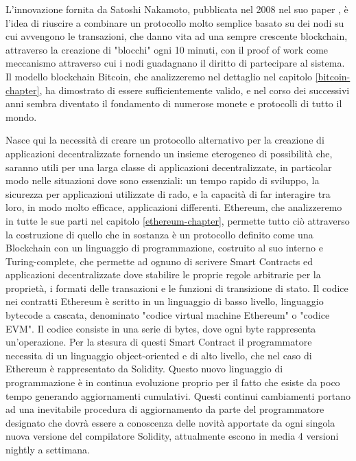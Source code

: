 L'innovazione fornita da Satoshi Nakamoto, pubblicata nel 2008 nel suo paper \cite{paper-bitcoin:satoshi}, è l'idea di riuscire a combinare un protocollo molto semplice basato su dei nodi su cui avvengono le transazioni, che danno vita ad una sempre crescente blockchain, attraverso la creazione di "blocchi" ogni 10 minuti, con il proof of work come meccanismo attraverso cui i nodi guadagnano il diritto di partecipare al sistema. Il modello blockchain Bitcoin, che analizzeremo nel dettaglio nel capitolo \ref{bitcoin-chapter}, ha dimostrato di essere sufficientemente valido, e nel corso dei successivi anni sembra diventato il fondamento di numerose monete e protocolli di tutto il mondo. 

Nasce qui la necessità di creare un protocollo alternativo per la creazione di applicazioni decentralizzate fornendo un insieme eterogeneo di possibilità che, saranno utili per una larga classe di applicazioni decentralizzate, in particolar modo nelle situazioni dove sono essenziali: un tempo rapido di sviluppo, la sicurezza per applicazioni utilizzate di rado, e la capacità di far interagire tra loro, in modo molto efficace, applicazioni differenti. Ethereum, che analizzeremo in tutte le sue parti nel capitolo \ref{ethereum-chapter}, permette tutto ciò attraverso la costruzione di quello che in sostanza è un protocollo definito come una Blockchain con un linguaggio di programmazione, costruito al suo interno e Turing-complete, che permette ad ognuno di scrivere Smart Contracts ed applicazioni decentralizzate dove stabilire le proprie regole arbitrarie per la proprietà, i formati delle transazioni e le funzioni di transizione di stato. Il codice nei contratti Ethereum è scritto in un linguaggio di basso livello, linguaggio bytecode a cascata, denominato "codice virtual machine Ethereum" o "codice EVM". Il codice consiste in una serie di bytes, dove ogni byte rappresenta un'operazione. Per la stesura di questi Smart Contract il programmatore necessita di un linguaggio object-oriented e di alto livello, che nel caso di Ethereum è rappresentato da Solidity. Questo nuovo linguaggio di programmazione è in continua evoluzione proprio per il fatto che esiste da poco tempo generando aggiornamenti cumulativi. Questi continui cambiamenti portano ad una inevitabile procedura di aggiornamento da parte del programmatore designato che dovrà essere a conoscenza delle novità apportate da ogni singola nuova versione del compilatore Solidity, attualmente escono in media 4 versioni nightly a settimana. 

